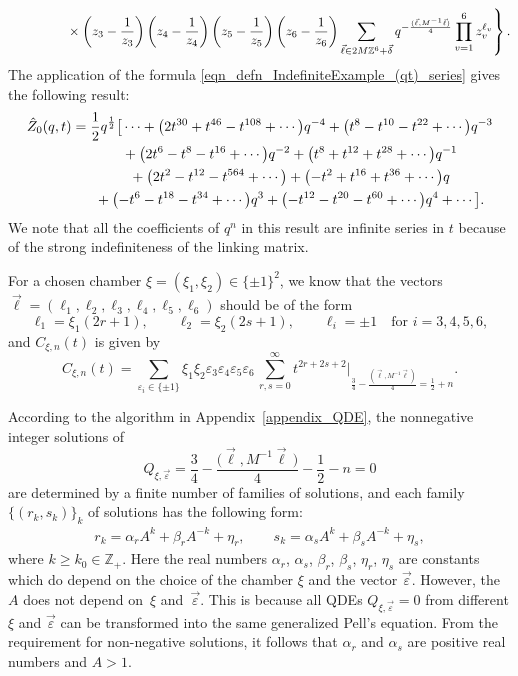 \documentclass[pdftex]{sigma}
\numberwithin{equation}{section}
\begin{document}
\begin{Example}
\begin{gather}
 \left.
 \hphantom{\hat{Z}_0(q,t) =}{}
 \times \left(z_3-\frac{1}{z_3}\right)\left(z_4-\frac{1}{z_4}\right)\left(z_5-\frac{1}{z_5}\right)\left(z_6-\frac{1}{z_6}\right)\sum_{\vec{\ell}\in 2M\mathbb{Z}^6+\vec{\delta}}q^{-\frac{(\vec{\ell},M^{-1}\vec{\ell})}{4}}\prod_{v=1}^{6}z_v^{\ell_v}\right\}.\nonumber
\end{gather}
	The application of the formula \eqref{eqn_defn_IndefiniteExample_(qt)_series} gives the following result:
	\begin{gather*}
			\hat{Z}_0(q,t) =\frac{1}{2}q^{\frac{1}{2}}\big[\cdots+\big(2t^{30}+t^{46}-t^{108}+\cdots\big)q^{-4}+\big(t^8-t^{10}-t^{22}+\cdots\big)q^{-3}\\
\hphantom{\hat{Z}_0(q,t) =}{}
+\big(2t^6-t^8-t^{16}+\cdots\big)q^{-2}+\big(t^8+t^{12}+t^{28}+\cdots\big)q^{-1}\\
\hphantom{\hat{Z}_0(q,t) =}{}+\big(2t^2-t^{12}-t^{564}+\cdots\big)+\big({-}t^2+t^{16}+t^{36}+\cdots\big)q\\
\hphantom{\hat{Z}_0(q,t) =}{}+\big({-}t^6-t^{18}-t^{34}+\cdots\big)q^3+\big({-}t^{12}-t^{20}-t^{60}+\cdots\big)q^4+\cdots\big].
		\end{gather*}
	We note that all the coefficients of $ q^n $ in this result are infinite series in $ t $ because of the strong indefiniteness of the linking matrix.
	
	For a chosen chamber $ \xi=(\xi_1,\xi_2)\in\{\pm1\}^2 $, we know that the vectors $ \vec{\ell}=(\ell_1,\ell_2,\ell_3,\ell_4,\ell_5,\ell_6) $ should be of the form
	\[
	\ell_1=\xi_1(2r+1), \qquad \ell_2=\xi_2(2s+1), \qquad \ell_i=\pm1 \quad \text{for } i=3,4,5,6,
	\]
	and $ C_{\xi,n}(t) $ is given by
	\begin{equation}\label{eqn_C_(xi,n)_t_indefinite_example}
		C_{\xi,n}(t)= \sum_{\varepsilon_i\in\{\pm1\}} \xi_1\xi_2\varepsilon_3\varepsilon_4\varepsilon_5\varepsilon_6 \,\sum_{r,s=0}^{\infty}t^{2r+2s+2} \Big|_{\frac{3}{4}-\frac{(\vec{\ell},M^{-1}\vec{\ell})}{4}=\frac{1}{2}+n}.
	\end{equation}
	
	According to the algorithm in Appendix~\ref{appendix_QDE}, the nonnegative integer solutions of
	\[
	Q_{\xi,\vec{\varepsilon}}=\frac{3}{4}-\frac{\big(\vec{\ell},M^{-1}\vec{\ell}\,\big)}{4}-\frac{1}{2}-n=0
	\]
	are determined by a finite number of families of solutions, and each family $ \{(r_k,s_k)\}_{k} $ of solutions has the following form:
	\begin{gather*}
			r_k =\alpha_r A^k +\beta_r A^{-k}+\eta_r,\qquad
			s_k =\alpha_s A^k +\beta_s A^{-k}+\eta_s,
		\end{gather*}
	where $ k\geq k_0\in \mathbb{Z}_{+} $. Here the real numbers $ \alpha_r$, $\alpha_s$, $\beta_r$, $\beta_s$, $\eta_r$, $\eta_s $ are constants which do depend on the choice of the chamber $ \xi $ and the vector $ \vec{\varepsilon} $. However, the $ A $ does not depend on~$ \xi $ and~$ \vec{\varepsilon} $. This is because all QDEs $ Q_{\xi,\vec{\varepsilon}}=0 $ from different $ \xi $ and $ \vec{\varepsilon} $ can be transformed into the same generalized Pell's equation. From the requirement for non-negative solutions, it follows that $ \alpha_r $ and $ \alpha_s $ are positive real numbers and $ A>1 $.
	

\end{Example}
\end{document}
